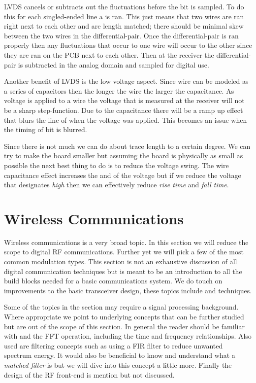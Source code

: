 \ac{LVDS} cancels or subtracts out the fluctuations before the bit is sampled. To do this for each singled-ended line a  is ran. This just means that two wires are ran right next to each other and are length matched; there should be minimal skew between the two wires in the differential-pair. Once the differential-pair is ran properly then any fluctuations that occur to one wire will occur to the other since they are ran on the \ac{PCB} next to each other. Then at the receiver the differential-pair is subtracted in the analog domain and sampled for digital use.

Another benefit of \ac{LVDS} is the low voltage aspect. Since wire can be modeled as a series of capacitors then the longer the wire the larger the capacitance. As voltage is applied to a wire the voltage that is measured at the receiver will not be a sharp step-function. Due to the capacitance there will be a ramp up effect that blurs the line of when the voltage was applied. This becomes an issue when the timing of bit is blurred.

Since there is not much we can do about trace length to a certain degree. We can try to make the board smaller but assuming the board is physically as small as possible the next best thing to do is to reduce the voltage swing. The wire capacitance effect increases the \emph{} and \emph{} of the voltage but if we reduce the voltage that designates \emph{high} then we can effectively reduce \emph{rise time} and \emph{fall time}.	
	
	
\section{Wireless Communications}

Wireless communications is a very broad topic. In this section we will reduce the scope to digital \ac{RF} communications. Further yet we will pick a few of the most common modulation types. This section is not an exhaustive discussion of all digital communication techniques but is meant to be an introduction to all the build blocks needed for a basic communications system. We do touch on improvements to the basic transceiver design, these topics include  and  techniques.

Some of the topics in the section may require a signal processing background. Where appropriate we point to underlying concepts that can be further studied but are out of the scope of this section. In general the reader should be familiar with  and the \ac{FFT} operation, including the time and frequency relationships. Also used are filtering concepts such as using a \ac{FIR} filter to reduce unwanted spectrum energy. It would also be beneficial to know and understand what a \emph{matched filter} is but we will dive into this concept a little more. Finally the design of the \ac{RF} front-end is mention but not discussed.


